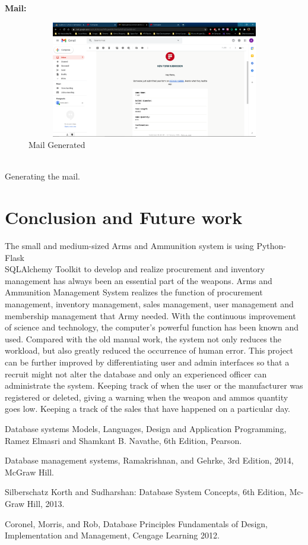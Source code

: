 \documentclass[12pt,a4paper]{report}
\begin{document}
\textbf{Mail:}\\
\begin{figure}[hbtp]
\centering
\includegraphics[width=6in,height=2in]{../fig/mail}
\caption{Mail Generated}
\end{figure}\\
\noindent
Generating the mail.

\chapter{Conclusion and Future work}
\noindent
The small and medium-sized Arms and Ammunition system is using Python-Flask \\SQLAlchemy Toolkit to develop and realize procurement and inventory management has always been an essential part of the weapons. Arms and Ammunition Management System realizes the function of procurement management, inventory management, sales management, user management and membership management that Army needed. With the continuous improvement of science and technology, the computer's powerful function has been known and used. Compared with the old manual work, the system not only reduces the workload, but also greatly reduced the occurrence of human error. 
\noindent
This project can be further improved by differentiating user and admin interfaces so that a recruit might not alter the database and only an experienced officer can administrate the system.
Keeping track of when the user or the manufacturer was registered or deleted, giving a warning when
the weapon and ammos quantity goes low. Keeping a track of the sales that have happened on a particular day.
\newpage
\pagestyle{plain}
\renewcommand{\bibname}{References}

\begin{thebibliography}{35}
Database systems Models, Languages, Design and Application Programming, Ramez Elmasri and Shamkant B. Navathe, 6th Edition, Pearson.

Database management systems, Ramakrishnan, and Gehrke, 3rd Edition, 2014, McGraw Hill.

Silberschatz Korth and Sudharshan: Database System Concepts, 6th Edition, Mc-Graw Hill, 2013.

Coronel, Morris, and Rob, Database Principles Fundamentals of Design, Implementation and  
Management, Cengage Learning 2012.

\end{thebibliography}
\end{document}
